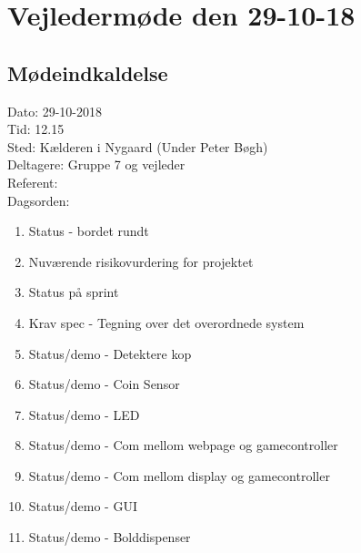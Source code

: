\section{Vejledermøde den 29-10-18}
\subsection{Mødeindkaldelse}
Dato: 29-10-2018
\\Tid: 12.15
\\Sted: Kælderen i Nygaard (Under Peter Bøgh)
\\Deltagere: Gruppe 7 og vejleder
\\Referent: 
\\Dagsorden: 
\begin{enumerate}
    \item Status - bordet rundt
    \item Nuværende risikovurdering for projektet
    \item Status på sprint
    \item Krav spec - Tegning over det overordnede system
    \item Status/demo - Detektere kop
    \item Status/demo - Coin Sensor
    \item Status/demo - LED
    \item Status/demo - Com mellom webpage og gamecontroller
    \item Status/demo - Com mellom display og gamecontroller
    \item Status/demo - GUI
    \item Status/demo - Bolddispenser
    
\end{enumerate}

